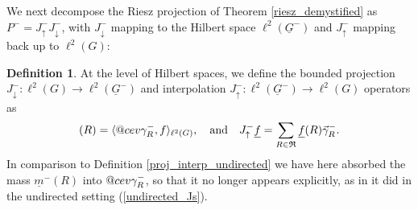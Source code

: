 \documentclass[reqno,12pt,letterpaper]{amsart}
\makeatletter
\numberwithin{equation}{section}
\DeclareRobustCommand{\cev}[1]{%
	\mathpalette\do@cev{#1}%
}
\newcommand{\do@cev}[2]{%
	\fix@cev{#1}{+}%
	\reflectbox{$\m@th#1\vec{\reflectbox{$\fix@cev{#1}{-}\m@th#1#2\fix@cev{#1}{+}$}}$}%
	\fix@cev{#1}{-}%
}
\newcommand{\fix@cev}[2]{%
	\ifx#1\displaystyle
	\mkern#23mu
	\else
	\ifx#1\textstyle
	\mkern#23mu
	\else
	\ifx#1\scriptstyle
	\mkern#22mu
	\else
	\mkern#22mu
	\fi
	\fi
	\fi
}
\newcommand{\1}{\mathds{1}}
\theoremstyle{definition}
\newtheorem{Def}[Th]{Definition}
\makeatother
\begin{document}
\medskip
	
	

	
	
	
	We next decompose the Riesz projection of Theorem \ref{riesz_demystified}   as $
	 	P^- = J^-_{\uparrow}J^-_\downarrow$,
	 with $J^-_\downarrow$ mapping to the Hilbert space $\ell^2(\underline{G}^-)$ and $J^-_{\uparrow}$ mapping back up to $\ell^2(G)$:
	 \begin{Def}\label{proj_interp_indeg}
	 	At the level of Hilbert spaces, we define the bounded projection $J^-_\downarrow: \ell^2(G) \rightarrow \ell^2(\underline{G}^-)$ and interpolation $J^-_\uparrow: \ell^2(\underline{G}^-) \rightarrow \ell^2(G)$ operators as 
	 	\begin{align}
	 		[J^-_\downarrow f](R) = \langle \cev\gamma^{-}_{R} , f \rangle_{\ell^2(G)},\quad \text{and} \quad J^-_\uparrow \underline{f} = \sum_{R \in \mathfrak{R}} \underline{f}(R)  \vec\gamma^{-}_{R}.
	 	\end{align}
	 In comparison to Definition \ref{proj_interp_undirected}  we have here absorbed the mass $\underline{m}^-(R)$ into  $\cev\gamma^{-}_{R}$, so that it no longer appears explicitly, as in it did in the undirected setting (\ref{undirected_Js}). 
	 \end{Def}
	 
\end{document}
